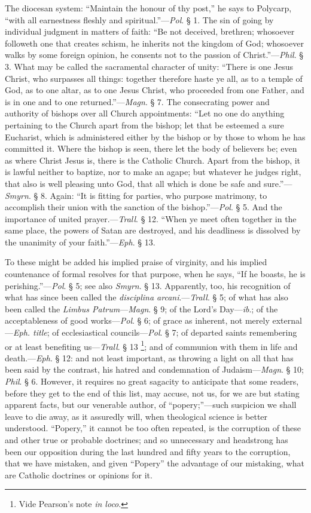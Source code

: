 The diocesan system: ``Maintain the honour of thy post,'' he says to
Polycarp, ``with all earnestness fleshly and spiritual.''—\emph{Pol}.
§ 1. The sin of going by individual judgment in matters of faith: ``Be
not deceived, brethren; whosoever followeth one that creates schism,
he inherits not the kingdom of God; whosoever walks by some foreign
opinion, he consents not to the passion of Christ.''—\emph{Phil}. §
3. What may be called the sacramental character of unity: ``There is
one Jesus Christ, who surpasses all things: together therefore haste
ye all, as to a temple of God, as to one altar, as to one Jesus
Christ, who proceeded from one Father, and is in one and to one
returned.''—\emph{Magn}. § 7. The consecrating power and authority
of bishops over all Church appointments: ``Let no one do anything
pertaining to the Church apart from the bishop; let that be esteemed a
sure Eucharist, which is administered either by the bishop or by those
to whom he has committed it. Where the bishop is seen, there let the
body of believers be; even as where Christ Jesus is, there is the
Catholic Church. Apart from the bishop, it is lawful neither to
baptize, nor to make an agape; but whatever he judges right, that also
is well pleasing unto God, that all which is done be safe and sure.''—\emph{Smyrn}.
§ 8. Again: ``It is fitting for parties, who purpose matrimony,
to accomplish their union with the sanction of the bishop.''—\emph{Pol}.
§ 5. And the importance of united prayer.—\emph{Trall}. § 12. ``When
ye meet often together in the same place, the powers of Satan are
destroyed, and his deadliness is dissolved by the unanimity of your
faith.''—\emph{Eph}. § 13.

To these might be added his implied praise of
virginity, and his implied countenance of formal resolves for that
purpose, when he says, ``If he boasts, he is perishing.''—\emph{Pol}.
§ 5; see also \emph{Smyrn}. § 13. Apparently, too, his recognition
of what has since been called the \emph{disciplina arcani}.—\emph{Trall}.
§ 5; of what has also been called the \emph{Limbus Patrum}—\emph{Magn}.
§ 9; of the Lord's Day—\emph{ib}.; of the acceptableness of good
works—\emph{Pol}. § 6; of grace as inherent, not merely external—\emph{Eph.
title}; of ecclesiastical councils—\emph{Pol}. § 7; of departed
saints remembering or at least benefiting us—\emph{Trall}. § 13 \footnote{Vide Pearson's note \emph{in loco}.}; and of communion with them in life and death.—\emph{Eph}. §
12: and not least important, as throwing a light on all that has been
said by the contrast, his hatred and condemnation of Judaism—\emph{Magn}.
§ 10; \emph{Phil}. § 6. However, it requires no great sagacity to
anticipate that some readers, before they get to the end of this list,
may accuse, not us, for we are but stating apparent facts, but our
venerable author, of ``popery;''—such suspicion we shall leave to die
away, as it assuredly will, when theological science is better
understood. ``Popery,'' it cannot be too often repeated, is the
corruption of these and other true or probable doctrines; and so
unnecessary and headstrong has been our opposition during the last
hundred and fifty years to the corruption, that we have mistaken, and
given ``Popery'' the advantage of our mistaking, what are Catholic
doctrines or opinions for it.

